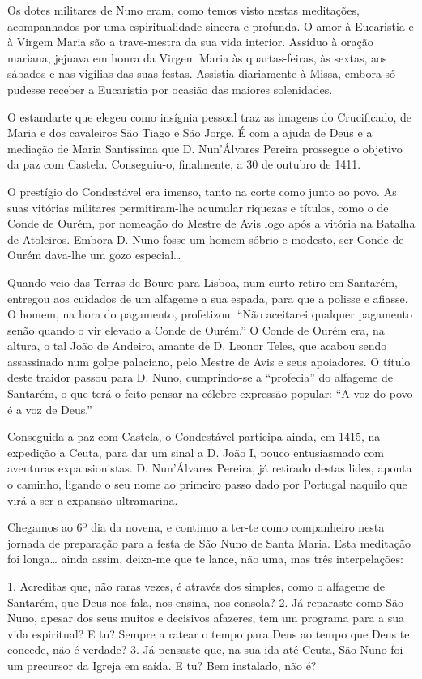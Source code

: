 \documentclass[a4paper,14pt]{extarticle} \usepackage[utf8]{inputenc}
\begin{document}
Os dotes militares de Nuno eram, como temos visto nestas meditações, acompanhados por uma espiritualidade sincera e profunda. O amor à Eucaristia e à Virgem Maria são a trave-mestra da sua vida interior. Assíduo à oração mariana, jejuava em honra da Virgem Maria às quartas-feiras, às sextas, aos sábados e nas vigílias das suas festas. Assistia diariamente à Missa, embora só pudesse receber a Eucaristia por ocasião das maiores solenidades.

O estandarte que elegeu como insígnia pessoal traz as imagens do Crucificado, de Maria e dos cavaleiros São Tiago e São Jorge. É com a ajuda de Deus e a mediação de Maria Santíssima que D. Nun’Álvares Pereira prossegue o objetivo da paz com Castela. Conseguiu-o, finalmente, a 30 de outubro de 1411.

O prestígio do Condestável era imenso, tanto na corte como junto ao povo. As suas vitórias militares permitiram-lhe acumular riquezas e títulos, como o de Conde de Ourém, por nomeação do Mestre de Avis logo após a vitória na Batalha de Atoleiros. Embora D. Nuno fosse um homem sóbrio e modesto, ser Conde de Ourém dava-lhe um gozo especial…

Quando veio das Terras de Bouro para Lisboa, num curto retiro em Santarém, entregou aos cuidados de um alfageme a sua espada, para que a polisse e afiasse. O homem, na hora do pagamento, profetizou: “Não aceitarei qualquer pagamento senão quando o vir elevado a Conde de Ourém.” O Conde de Ourém era, na altura, o tal João de Andeiro, amante de D. Leonor Teles, que acabou sendo assassinado num golpe palaciano, pelo Mestre de Avis e seus apoiadores. O título deste traidor passou para D. Nuno, cumprindo-se a “profecia” do alfageme de Santarém, o que terá o feito pensar na célebre expressão popular: “A voz do povo é a voz de Deus.”

Conseguida a paz com Castela, o Condestável participa ainda, em 1415, na expedição a Ceuta, para dar um sinal a D. João I, pouco entusiasmado com aventuras expansionistas. D. Nun’Álvares Pereira, já retirado destas lides, aponta o caminho, ligando o seu nome ao primeiro passo dado por Portugal naquilo que virá a ser a expansão ultramarina.

Chegamos ao 6º dia da novena, e continuo a ter-te como companheiro nesta jornada de preparação para a festa de São Nuno de Santa Maria. Esta meditação foi longa… ainda assim, deixa-me que te lance, não uma, mas três interpelações:

1. Acreditas que, não raras vezes, é através dos simples, como o alfageme de Santarém, que Deus nos fala, nos ensina, nos consola?
2. Já reparaste como São Nuno, apesar dos seus muitos e decisivos afazeres, tem um programa para a sua vida espiritual? E tu? Sempre a ratear o tempo para Deus ao tempo que Deus te concede, não é verdade?
3. Já pensaste que, na sua ida até Ceuta, São Nuno foi um precursor da Igreja em saída. E tu? Bem instalado, não é?
\end{document}
